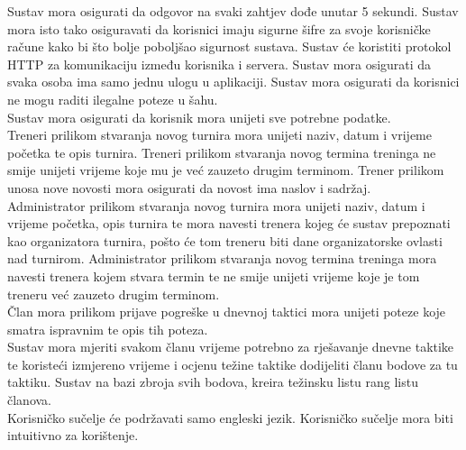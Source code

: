 			Sustav mora osigurati da odgovor na svaki zahtjev dođe unutar 5 sekundi.  Sustav mora isto tako osiguravati da korisnici imaju sigurne šifre za svoje korisničke račune kako bi što bolje poboljšao sigurnost sustava. Sustav će koristiti protokol HTTP za komunikaciju između korisnika i servera. Sustav mora osigurati da svaka osoba ima samo jednu ulogu u aplikaciji. Sustav mora osigurati da korisnici ne mogu raditi ilegalne poteze u šahu.\\
			Sustav mora osigurati da korisnik mora unijeti sve potrebne podatke. \\
			Treneri prilikom stvaranja novog turnira mora unijeti naziv, datum i vrijeme početka te opis turnira. Treneri prilikom stvaranja novog termina treninga ne smije unijeti vrijeme koje mu je već zauzeto drugim terminom. Trener prilikom unosa nove novosti mora osigurati da novost ima naslov i sadržaj. \\
			Administrator prilikom stvaranja novog turnira mora unijeti naziv, datum i vrijeme početka, opis turnira te mora navesti trenera kojeg će sustav prepoznati kao organizatora turnira, pošto će tom treneru biti dane organizatorske ovlasti nad turnirom. Administrator prilikom stvaranja novog termina treninga mora navesti trenera kojem stvara termin te ne smije unijeti vrijeme koje je tom treneru već zauzeto drugim terminom.\\
			Član mora prilikom prijave pogreške u dnevnoj taktici mora unijeti poteze koje smatra ispravnim te opis tih poteza.\\
			Sustav mora mjeriti svakom članu vrijeme potrebno za rješavanje dnevne taktike te koristeći izmjereno vrijeme i ocjenu težine taktike dodijeliti članu bodove za tu taktiku. Sustav na bazi zbroja svih bodova, kreira težinsku listu rang listu članova.\\
			Korisničko sučelje će podržavati samo engleski jezik. Korisničko sučelje mora biti intuitivno za korištenje.\\
			
		 
			 
			 
			 
			 
	